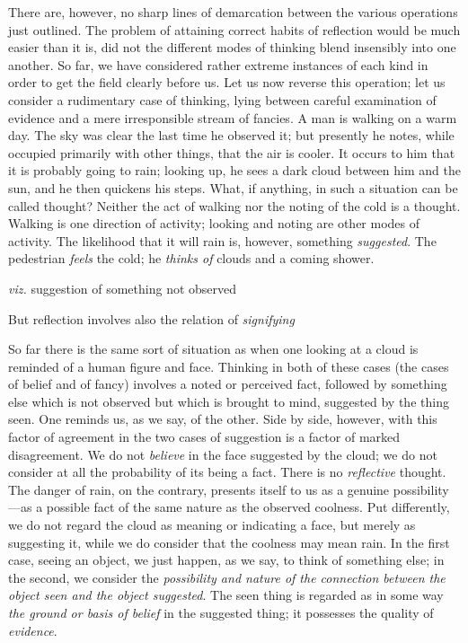 \documentclass[letterpaper]{book}
\begin{document}
There are, however, no sharp lines of demarcation between the various
operations just outlined. The problem of attaining correct habits of
reflection would be much easier than it is, did not the different modes
of thinking blend insensibly into one another. So far, we have
considered rather extreme instances of each kind in order to get the
field clearly before us. Let us now reverse this operation; let us
consider a rudimentary case of thinking, lying between careful
examination of evidence and a mere irresponsible stream of fancies. A
man is walking on a warm day. The sky was clear the last time he
observed it; but presently he notes, while occupied primarily with other
things, that the air is cooler. It occurs to him that it is probably
going
to
rain; looking up, he sees a dark cloud between him and the sun, and he
then quickens his steps. What, if anything, in such a situation can be
called thought? Neither the act of walking nor the noting of the cold is
a thought. Walking is one direction of activity; looking and noting are
other modes of activity. The likelihood that it will rain is, however,
something \emph{suggested}. The pedestrian \emph{feels} the cold; he
\emph{thinks of} clouds and a coming shower.

\emph{viz.} suggestion of something not observed

But reflection involves also the relation of \emph{signifying}

So far there is the same sort of situation as when one looking at a
cloud is reminded of a human figure and face. Thinking in both of these
cases (the cases of belief and of fancy) involves a noted or perceived
fact, followed by something else which is not observed but which is
brought to mind, suggested by the thing seen. One reminds us, as we say,
of the other. Side by side, however, with this factor of agreement in
the two cases of suggestion is a factor of marked disagreement. We do
not \emph{believe} in the face suggested by the cloud; we do not
consider at all the probability of its being a fact. There is no
\emph{reflective} thought. The danger of rain, on the contrary, presents
itself to us as a genuine possibility---as a possible fact of the same
nature as the observed coolness. Put differently, we do not regard the
cloud as meaning or indicating a face, but merely as suggesting it,
while we do consider that the coolness may mean rain. In the first case,
seeing an object, we just happen, as we say, to think of something else;
in the second, we consider the \emph{possibility and nature of the
connection between the object seen and the object suggested}. The seen
thing is regarded as in some way \emph{the ground or basis of belief} in
the suggested thing; it possesses the quality of
\emph{evidence}.
\end{document}
